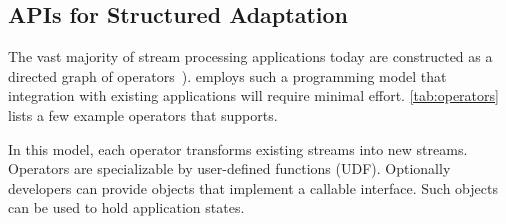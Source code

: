 \subsection{APIs for Structured Adaptation}
\label{sec:struct-adapt}

The vast majority of stream processing applications today are constructed as a
directed graph of operators~\cite{toshniwal2014storm, zaharia2013discretized}).
\sysname{} employs such a programming model that integration with existing
applications will require minimal effort. \autoref{tab:operators} lists a few
example operators that \sysname{} supports.

In this model, each operator transforms existing streams into new
streams. Operators are specializable by user-defined functions (UDF). Optionally
developers can provide objects that implement a callable interface. Such objects
can be used to hold application states.

